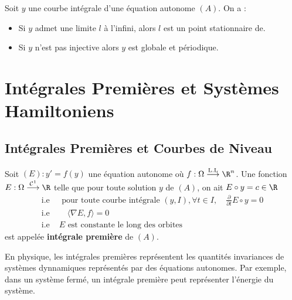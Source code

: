 \begin{proposition}
    Soit $y$ une courbe intégrale d'une équation autonome $(A)$. On a : 
    \begin{itemize}
        \item Si $y$ admet une limite $l$ à l'infini, alors $l$ est un point stationnaire de. 
        \item Si $y$ n'est pas injective alors $y$ est globale et périodique. 
    \end{itemize}
\end{proposition}

\newpage 


\section{Intégrales Premières et Systèmes Hamiltoniens}

\subsection{Intégrales Premières et Courbes de Niveau}

\begin{definition}
    Soit $(E) : y' = f(y)$ une équation autonome où $f : \Omega \overset{\text{L.L}}{\longrightarrow} \R^n$. 
    Une fonction $E : \Omega \overset{ \mathcal{C}^1}{\longrightarrow} \R$ telle que pour toute 
    solution $y$ de $(A)$, on ait $E \circ y = c \in \R $ 
    \begin{align*}
        \text{i.e } & \text{ pour toute courbe intégrale } (y,I), \forall t \in I, \quad \frac{\partial}{\partial t} E \circ y = 0 \\ 
        \text{i.e } & \quad \langle \nabla E, f \rangle = 0 \\ 
        \text{i.e } & E \text{ est constante le long des orbites}
    \end{align*}
    est appelée \textbf{intégrale première} de $(A)$. 
\end{definition}

En physique, les intégrales premières représentent les quantités invariances de systèmes dynnamiques représentés par des équations 
autonomes. Par exemple, dans un système fermé, un intégrale première peut représenter l'énergie du système.

